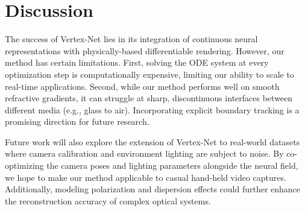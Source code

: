 \section{Discussion}
The success of Vertex-Net lies in its integration of continuous neural representations with physically-based differentiable rendering. However, our method has certain limitations. First, solving the ODE system at every optimization step is computationally expensive, limiting our ability to scale to real-time applications. Second, while our method performs well on smooth refractive gradients, it can struggle at sharp, discontinuous interfaces between different media (e.g., glass to air). Incorporating explicit boundary tracking is a promising direction for future research.

Future work will also explore the extension of Vertex-Net to real-world datasets where camera calibration and environment lighting are subject to noise. By co-optimizing the camera poses and lighting parameters alongside the neural field, we hope to make our method applicable to casual hand-held video captures. Additionally, modeling polarization and dispersion effects could further enhance the reconstruction accuracy of complex optical systems.
